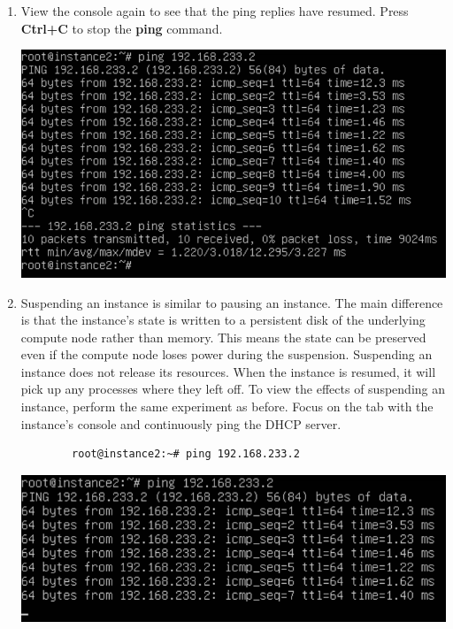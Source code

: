 \documentclass[letterpaper, 12pt]{article}
\begin{document}
\begin{enumerate}
    \item View the console again to see that the ping replies have resumed.
    Press \textbf{Ctrl+C} to stop the \textbf{ping} command.

    \begin{center}
        \includegraphics[width=\linewidth]{images/part3/step6.png}
    \end{center}

    \item Suspending an instance is similar to pausing an instance.
    The main difference is that the instance's state is written to a persistent disk of the underlying compute node rather than memory.
    This means the state can be preserved even if the compute node loses power during the suspension.
    Suspending an instance does not release its resources.
    When the instance is resumed, it will pick up any processes where they left off.
    To view the effects of suspending an instance, perform the same experiment as before.
    Focus on the tab with the instance's console and continuously ping the DHCP server.
    \begin{lstlisting}
        root@instance2:~# ping 192.168.233.2
    \end{lstlisting}

    \begin{center}
        \includegraphics[width=\linewidth]{images/part3/step7.png}
    \end{center}


\end{enumerate}
\end{document}
